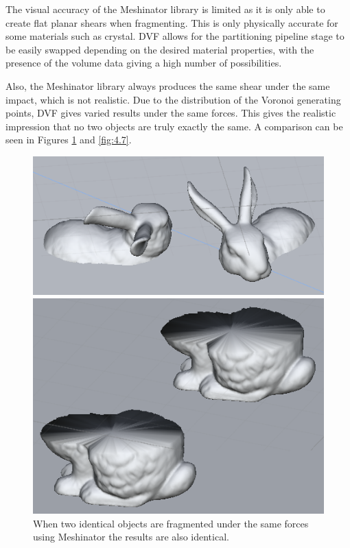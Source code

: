 The visual accuracy of the Meshinator library is limited as it is only able to create flat planar shears when fragmenting. This is only physically accurate for some materials such as crystal. DVF allows for the partitioning pipeline stage to be easily swapped depending on the desired material properties, with the presence of the volume data giving a high number of possibilities.

Also, the Meshinator library always produces the same shear under the same impact, which is not realistic. Due to the distribution of the Voronoi generating points, DVF gives varied results under the same forces. This gives the realistic impression that no two objects are truly exactly the same. A comparison can be seen in Figures \ref{fig:4.6} and \ref{fig:4.7}.

\begin{figure}[b!]
\centerline{\includegraphics[scale=0.8]{fracture_same_shape.png}}
\vspace{0.1in}
\centerline{\includegraphics[scale=0.85]{fracture_same_shape2.png}}
\caption{When two identical objects are fragmented under the same forces using Meshinator the results are also identical.}
\label{fig:4.6}
\end{figure}
